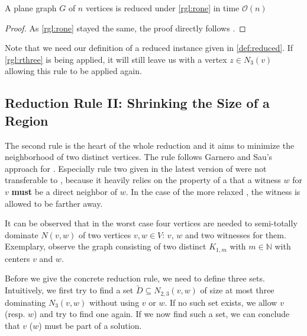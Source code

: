 \begin{lemma}
    A plane graph $G$ of $n$ vertices is reduced under \cref{rgl:rone} in time $\mathcal{O}(n)$
\end{lemma}
\begin{proof}
    As \cref{rgl:rone} stayed the same, the proof directly follows \cite[Lemma 2]{Alber2004}.
\end{proof}

Note that we need our definition of a reduced instance given in \ref{def:reduced}. If \cref{rgl:rthree} is being applied, it will still leave us with a vertex $z\in N_3(v)$ allowing this rule to be applied again.

\subsection{Reduction Rule II: Shrinking the Size of a Region}

The second rule is the heart of the whole reduction and it aims to minimize the neighborhood of two distinct vertices. The rule follows Garnero and Sau's approach \cite{Garnero2018} for \ptdom. Especially rule two given in the latest version of \cite[Revision 2018]{Garnero2018} were not transferable to \psdom, because it heavily relies on the property of a \tdom that a witness $w$ for $v$ \textbf{must} be a direct neighbor of $w$. In the case of the more relaxed \sdom, the witness is allowed to be farther away.


It can be observed that in the worst case four vertices are needed to semi-totally dominate $N(v,w)$ of two vertices $v,w \in V$: $v$, $w$ and two witnesses for them. Exemplary, observe the graph consisting of two distinct $K_{1,m}$ with $m \in \mathbb{N}$ with centers $v$ and $w$.

Before we give the concrete reduction rule, we need to define three sets. Intuitively, we first try to find a set $\tilde D \subseteq N_{2,3}(v,w)$ of size at most three dominating $N_3(v,w)$ without using $v$ or $w$. If no such set exists, we allow $v$ (resp. $w$) and try to find one again. If we now find such a set, we can conclude that $v$ ($w$) must be part of a solution.


